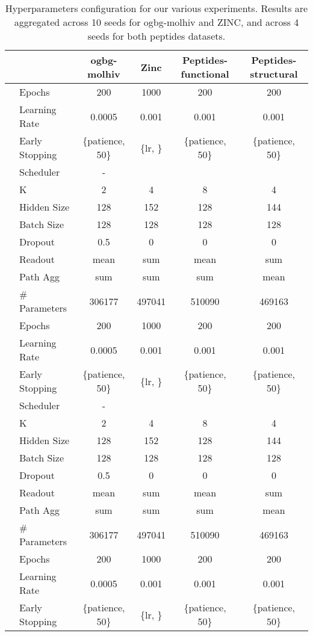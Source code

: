 \documentclass{article}
\theoremstyle{plain}
\theoremstyle{definition}
\theoremstyle{remark}
\begin{document}
\begin{table}[t]
\centering
\caption{Hyperparameters configuration for our various experiments. Results are aggregated across 10 seeds for ogbg-molhiv and ZINC, and across 4 seeds for both peptides datasets.}
\label{tab:param_config}
\scriptsize
\renewcommand{\arraystretch}{1.2}
\begin{tabular}{l|l|cccc}
\toprule
& & ogbg-molhiv & Zinc & Peptides-functional & Peptides-structural \\
\midrule
\multirow{10}{*}{}
& Epochs & 200 & 1000 & 200 & 200 \\ 
& Learning Rate & 0.0005 & 0.001 &  0.001 & 0.001 \\
& Early Stopping & \{patience, 50\} & \{lr, \} & \{patience, 50\} & \{patience, 50\}\\
& Scheduler & - &  & &  \\
& K & 2 & 4 & 8 & 4 \\
& Hidden Size & 128 & 152 & 128 & 144 \\
& Batch Size & 128 & 128 & 128 & 128 \\
& Dropout & 0.5 & 0 & 0 & 0 \\
& Readout & mean  & sum & mean & sum \\
& Path Agg & sum & sum & sum & mean \\
& \# Parameters & 306177 & 497041 & 510090 & 469163\\
\midrule
\multirow{10}{*}{}
& Epochs & 200 & 1000 & 200 & 200 \\
& Learning Rate & 0.0005 & 0.001 & 0.001 & 0.001\\
& Early Stopping & \{patience, 50\} & \{lr, \} & \{patience, 50\} & \{patience, 50\}\\
& Scheduler & - &  & &  \\
& K & 2 & 4 & 8 & 4 \\
& Hidden Size & 128 & 152 & 128 & 144\\
& Batch Size & 128 & 128 & 128 & 128\\
& Dropout & 0.5 & 0 & 0 & 0 \\
& Readout & mean & sum & mean & sum\\
& Path Agg & sum & sum & sum & mean \\
& \# Parameters & 306177 & 497041 & 510090 & 469163\\
\midrule
\multirow{10}{*}{}
& Epochs & 200 & 1000 & 200 & 200\\
& Learning Rate & 0.0005 & 0.001 & 0.001 & 0.001\\
& Early Stopping & \{patience, 50\} & \{lr, \} &  \{patience, 50\} & \{patience, 50\}\\

\end{tabular}
\end{table}
\end{document}

